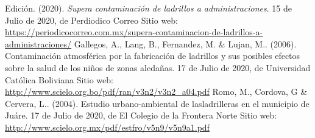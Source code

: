 \documentclass[12pt]{article}
\begin{document}

\begin{thebibliography}{X}
	 Edición. (2020). {\it Supera contaminación de ladrillos a administraciones}. 15 de Julio de 2020, de Perdiodico Correo Sitio web: \url{https://periodicocorreo.com.mx/supera-contaminacion-de-ladrillos-a-administraciones/}
	 Gallegos, A., Lang, B., Fernandez, M. \& Lujan, M.. (2006). Contaminaci\'on atmosf\'erica por la fabricaci\'on de ladrillos y sus posibles efectos sobre la salud de los ni\~nos de zonas aledañas. 17 de Julio de 2020, de Universidad Cat\'olica Boliviana Sitio web: \url{http://www.scielo.org.bo/pdf/ran/v3n2/v3n2_a04.pdf}
	 Romo, M., Cordova, G \& Cervera, L.. (2004). Estudio urbano-ambiental de lasladrilleras en el municipio de Juáre. 17 de Julio de 2020, de El Colegio de la Frontera Norte Sitio web: \url{http://www.scielo.org.mx/pdf/estfro/v5n9/v5n9a1.pdf}

\end{thebibliography}
\end{document}
